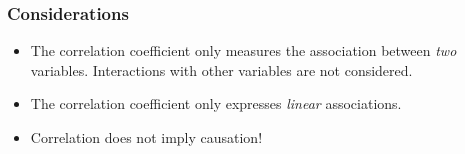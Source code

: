 \documentclass{beamer}
\begin{document}
\begin{frame}
  \frametitle{Considerations}
  
  \begin{itemize}
    \item The correlation coefficient only measures the association between \emph{two} variables. Interactions with other variables are not considered.
    \item The correlation coefficient only expresses \emph{linear} associations.
    \item Correlation does not imply causation!
  \end{itemize}
\end{frame}


\end{document}
